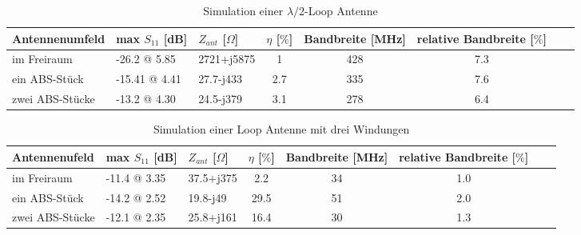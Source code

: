 
\begin{table}[!h]
 \centering
 \begin{tabular}{p{3cm} p{3cm} l c c c c r} 
 \toprule 
 Antennenumfeld 	& max $S_{11}$ [dB]		& $Z_{ant}$ [$\Omega$] 	& $\eta$ [$\%$] & Bandbreite [MHz] & relative Bandbreite [$\%$]\\ 
 \midrule
im Freiraum 		&	-26.2 @ 5.85	& 	2721+j5875	& 1		&	428 & 7.3\\ 					 		
ein ABS-Stück 	& -15.41 @ 4.41 	&	27.7-j433	& 2.7	&	335 & 7.6 \\
zwei ABS-Stücke & -13.2 @ 4.30 	&	24.5-j379	& 3.1	&	278 & 6.4\\
 \bottomrule
 \end{tabular}
 \caption{Simulation einer $\lambda/2$-Loop Antenne }
 \label{tab:Evaluation_Vergeich_Loop_Antennen_Lmabda05}
\end{table}

\begin{table}[!h]
 \centering
 \begin{tabular}{p{3cm} p{3cm} l c c c c r} 
 \toprule 
 Antennenufeld & max $S_{11}$ [dB]		& $Z_{ant}$ [$\Omega$] 	& $\eta$ [$\%$] & Bandbreite [MHz] & relative Bandbreite [$\%$]\\ 
 \midrule
im Freiraum 		&	-11.4 @ 3.35		& 	37.5+j375	& 	2.2		& 34		& 1.0\\ 					 		
ein ABS-Stück 	& -14.2 @ 2.52 		&	19.8-j49		&	29.5		& 51	 	& 2.0\\
zwei ABS-Stücke 	& -12.1 @ 2.35 		&	25.8+j161	&	16.4		& 30 	& 1.3\\
 \bottomrule
 \end{tabular}
 \caption{Simulation einer Loop Antenne mit drei Windungen }
 \label{tab:Evaluation_Vergeich_Loop_Antennen_Coil}
\end{table}

